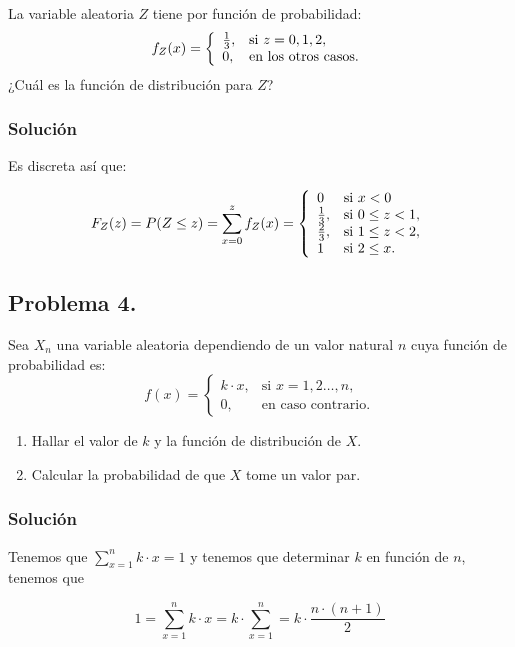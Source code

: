\documentclass[
]{article}
\providecommand{\tightlist}{%
  \setlength{\itemsep}{0pt}\setlength{\parskip}{0pt}}
\begin{document}
La variable aleatoria \(Z\) tiene por función de probabilidad:
\[f_Z (x)=
\left\{\begin{array}{ll}
{1\over 3}, & \mbox{si $z=0,1,2$},\\ 0, & \mbox{en los otros
casos.}
\end{array}\right.
\] ¿Cuál es la función de distribución para \(Z\)?

\subsubsection{Solución}\label{soluciuxf3n-2}

Es discreta así que:

\[F_Z(z)=P(Z\leq z)= \sum_{x=0}^z f_Z (x)=
\left\{\begin{array}{ll}
0 & \mbox{si }  x<0 \\
{1\over 3}, & \mbox{si } 0\leq z< 1,\\ 
{2\over 3}, & \mbox{si } 1\leq z< 2,\\ 
1 & \mbox{si }  2 \leq x.
\end{array}\right.
\]

\subsection{Problema 4.}\label{problema-4.}

Sea \(X_n\) una variable aleatoria dependiendo de un valor natural \(n\)
cuya función de probabilidad es: \[
f(x)=\begin{cases}
k\cdot x, & \mbox{si }x=1,2\ldots,n, \\
0, & \mbox{en caso contrario.}
\end{cases}
\]

\begin{enumerate}
\def\labelenumi{\arabic{enumi}.}
\tightlist
\item
  Hallar el valor de \(k\) y la función de distribución de \(X\).
\item
  Calcular la probabilidad de que \(X\) tome un valor par.
\end{enumerate}

\subsubsection{Solución}\label{soluciuxf3n-3}

Tenemos que \(\sum_{x=1}^n k\cdot x=1\) y tenemos que determinar \(k\)
en función de \(n\), tenemos que

\[
1=\sum_{x=1}^n k\cdot x= k\cdot \sum_{x=1}^n = k\cdot \frac{n\cdot (n+1)}{2}
\]
\end{document}
